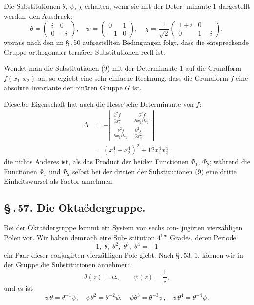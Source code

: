 \documentclass[12pt,a4paper]{article}
\theoremstyle{plain}
\theoremstyle{definition}
\theoremstyle{remark}
\newcommand{\sect}[1]{\S\,.\,#1.}
\begin{document}
Die Substitutionen $\theta$, $\psi$, $\chi$ erhalten, wenn sie mit der Deter-
minante 1 dargestellt werden, den Ausdruck:
\begin{equation}\label{eq:56_9}
\theta = \begin{pmatrix}i & 0\\ 0 & -i\end{pmatrix},\quad
\psi = \begin{pmatrix}0 & 1\\ -1 & 0\end{pmatrix},\quad
\chi = \frac{1}{\sqrt{2}}\begin{pmatrix}1+i & 0\\ 0 & 1-i\end{pmatrix},\tag{9}
\end{equation}
woraus nach den im \S\,.\,50 aufgestellten Bedingungen folgt, dass
die entsprechende Gruppe orthogonaler tern\"arer Substitutionen
reell ist.

Wendet man die Substitutionen (9) mit der Determinante 1
auf die Grundform $f(x_1, x_2)$ an, so ergiebt eine sehr einfache
Rechnung, dass die Grundform $f$ eine absolute Invariante
der bin\"aren Gruppe $G$ ist.

Dieselbe Eigenschaft hat auch die Hesse'sche Determinante
von $f$:
\begin{align*}
\Delta &= -\left|\begin{matrix}
\frac{\partial^2 f}{\partial x_1^2} & \frac{\partial^2 f}{\partial x_1\partial x_2}\\[6pt]
\frac{\partial^2 f}{\partial x_1\partial x_2} & \frac{\partial^2 f}{\partial x_2^2}
\end{matrix}\right|\\
&= (x_1^4 + x_2^4)^2 + 12x_1^4 x_2^4,
\end{align*}
die nichts Anderes ist, als das Product der beiden Functionen
$\Phi_1$, $\Phi_2$; w\"ahrend die Functionen $\Phi_1$ und $\Phi_2$ selbst bei der dritten
der Substitutionen (9) eine dritte Einheitswurzel als Factor
annehmen.


\subsection*{\sect{57} Die Okta\"edergruppe.}

Bei der Okta\"edergruppe kommt ein System von sechs con-
jugirten vierz\"ahligen Polen vor. Wir haben demnach eine Sub-
stitution $4^{\text{ten}}$ Grades, deren Periode
\[
1,\; \theta,\; \theta^2,\; \theta^3,\; \theta^4 = -1
\]
ein Paar dieser conjugirten vierz\"ahligen Pole giebt. Nach \S\,.\,53, 1.
k\"onnen wir in der Gruppe die Substitutionen annehmen:
\begin{equation}\label{eq:57_1}
\theta(z) = iz,\qquad \psi(z) = \frac{1}{z},\tag{1}
\end{equation}
und es ist
\begin{equation}\label{eq:57_2}
\psi\theta = \theta^{-1}\psi,\quad \psi\theta^2 = \theta^{-2}\psi,\quad \psi\theta^3 = \theta^{-3}\psi,\quad \psi\theta^4 = \theta^{-4}\psi.\tag{2}
\end{equation}
\end{document}
